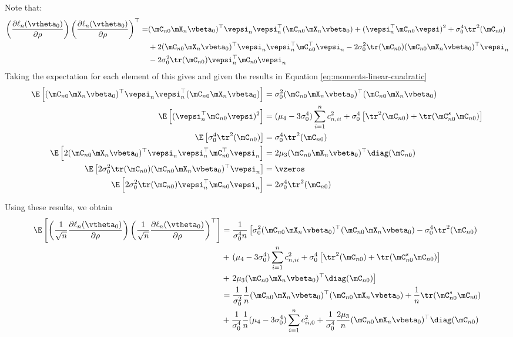 \documentclass[english,12pt]{book}\usepackage[]{graphicx}\usepackage[]{xcolor}
\begin{document}
\begin{subappendices}
Note that:
\begin{align*}
\left(\frac{\partial \ell_n(\vtheta_0)}{\partial \rho}\right)\left(\frac{\partial \ell_n(\vtheta_0)}{\partial \rho}\right)^\top  = &  (\mC_{n0}\mX_n\vbeta_0)^\top \vepsi_n\vepsi_n^\top(\mC_{n0}\mX_n\vbeta_0) + (\vepsi_n^\top\mC_{n0}\vepsi)^2 + \sigma_{0}^4\tr^2(\mC_{n0}) \\
& + 2(\mC_{n0}\mX_n\vbeta_0)^\top \vepsi_n\vepsi_n^\top\mC_{n0}^\top\vepsi_n - 2\sigma_{0}^2\tr(\mC_{n0})(\mC_{n0}\mX_n\vbeta_0)^\top \vepsi_n  \\
& - 2\sigma_{0}^2\tr(\mC_{n0})\vepsi_n^\top\mC_{n0}\vepsi_n
\end{align*}
Taking the expectation for each element of this gives and given the results in Equation \eqref{eq:moments-linear-cuadratic}
\begin{align*}
 \E\left[(\mC_{n0}\mX_n\vbeta_0)^\top \vepsi_n\vepsi_n^\top(\mC_{n0}\mX_n\vbeta_0)\right] & = \sigma_0^2(\mC_{n0}\mX_n\vbeta_0)^\top(\mC_{n0}\mX_n\vbeta_0) \\
 \E\left[(\vepsi_n^\top\mC_{n0}\vepsi)^2\right] & = (\mu_4 - 3\sigma^4_0)\sum_{i = 1}^nc_{n,ii}^2 + \sigma^4_0\left[\tr^2(\mC_{n0}) + \tr(\mC_{n0}^s\mC_{n0})\right] \\
  \E\left[\sigma_{0}^4\tr^2(\mC_{n0})\right] & = \sigma_0^4\tr^2(\mC_{n0}) \\
  \E\left[2(\mC_{n0}\mX_n\vbeta_0)^\top \vepsi_n\vepsi_n^\top\mC_{n0}^\top\vepsi_n\right] & = 2\mu_3(\mC_{n0}\mX_n\vbeta_0)^\top\diag(\mC_{n0}) \\
  \E\left[2\sigma_{0}^2\tr(\mC_{n0})(\mC_{n0}\mX_n\vbeta_0)^\top \vepsi_n\right] & = \vzeros \\
  \E\left[2\sigma_{0}^2\tr(\mC_{n0})\vepsi_n^\top\mC_{n0}\vepsi_n\right] & = 2\sigma_0^4\tr^2(\mC_{n0})
\end{align*}

Using these results, we obtain 
\begin{equation}
\begin{aligned}
  \E\left[\left(\frac{1}{\sqrt{n}}\frac{\partial \ell_n(\vtheta_0)}{\partial \rho}\right) \left(\frac{1}{\sqrt{n}}\frac{\partial \ell_n(\vtheta_0)}{\partial \rho}\right)^\top\right] & = \frac{1}{\sigma_0^4n}\left[\sigma_0^2(\mC_{n0}\mX_n\vbeta_0)^\top(\mC_{n0}\mX_n\vbeta_0) - \sigma_0^4\tr^2(\mC_{n0})\right. \\
  & + \left. (\mu_4 - 3\sigma^4_0)\sum_{i = 1}^nc_{n,ii}^2 + \sigma^4_0\left[\tr^2(\mC_{n0}) + \tr(\mC_{n0}^s\mC_{n0})\right] \right. \\
  & + \left.2\mu_3(\mC_{n0}\mX_n\vbeta_0)^\top\diag(\mC_{n0})\right] \\
 & =   \frac{1}{\sigma_0^2}\frac{1}{n}(\mC_{n0}\mX_n\vbeta_0)^\top(\mC_{n0}\mX_n\vbeta_0) + \frac{1}{n}\tr(\mC_{n0}^s\mC_{n0}) \\
 &  + \frac{1}{\sigma_0^4}\frac{1}{n}(\mu_4 - 3\sigma^4_0)\sum_{i = 1}^nc_{ii,0}^2 + \frac{1}{\sigma_0^4}\frac{2\mu_3}{n}(\mC_{n0}\mX_n\vbeta_0)^\top\diag(\mC_{n0})
\end{aligned}
\end{equation}


\end{subappendices}
\end{document}
